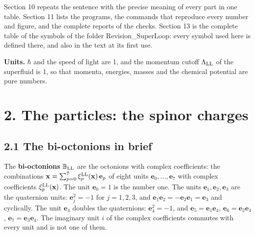 \documentclass[
  10pt,
]{article}
\begin{document}
Section 10 repeats the sentence with the precise meaning of every part
in one table. Section 11 lists the programs, the commands that reproduce
every number and figure, and the complete reports of the checks. Section
13 is the complete table of the symbols of the folder
Revision\_SuperLoop: every symbol used here is defined there, and also
in the text at its first use.

\textbf{Units.} \(\hbar\) and the speed of light are 1, and the momentum
cutoff \(\Lambda_{\rm LL}\) of the superfluid is 1, so that momenta,
energies, masses and the chemical potential are pure numbers.

\hypertarget{the-particles-the-spinor-charges}{%
\section{2. The particles: the spinor
charges}\label{the-particles-the-spinor-charges}}

\hypertarget{the-bi-octonions-in-brief}{%
\subsection{2.1 The bi-octonions in
brief}\label{the-bi-octonions-in-brief}}

The \textbf{bi-octonions} \(\mathbb B_{\rm LL}\) are the octonions with
complex coefficients: the combinations
\(\mathbf x=\sum_{p=0}^7\xi^{\rm LL}_p(\mathbf x)\,\mathbf e_p\) of
eight units \(\mathbf e_0,\dots,\mathbf e_7\) with complex coefficients
\(\xi^{\rm LL}_p(\mathbf x)\). The unit \(\mathbf e_0=1\) is the number
one. The units \(\mathbf e_1,\mathbf e_2,\mathbf e_3\) are the
quaternion units: \(\mathbf e_j^2=-1\) for \(j=1,2,3\), and
\(\mathbf e_1\mathbf e_2=-\mathbf e_2\mathbf e_1=\mathbf e_3\) and
cyclically. The unit \(\mathbf e_4\) doubles the quaternions:
\(\mathbf e_4^2=-1\), and \(\mathbf e_5=\mathbf e_1\mathbf e_4\),
\(\mathbf e_6=\mathbf e_2\mathbf e_4\),
\(\mathbf e_7=\mathbf e_3\mathbf e_4\). The imaginary unit \(i\) of the
complex coefficients commutes with every unit and is not one of them.
\end{document}

